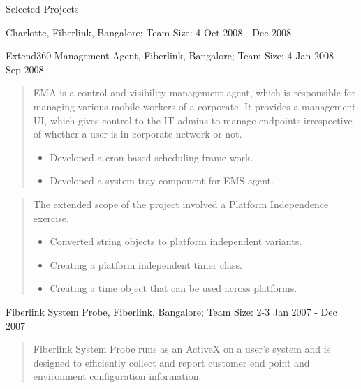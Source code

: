 \documentclass{resume}
\newcommand{\teamsize}{\sc\footnotesize Team Size: }
\begin{document}
\begin{category}{Selected Projects}{}

    \item {\topic Charlotte,} Fiberlink, Bangalore;
        {\teamsize 4}
        {\period Oct 2008 - Dec 2008}
        \begin{quote}
        \end{quote}

    \item {\topic Extend360 Management Agent,} Fiberlink, Bangalore;
        {\teamsize 4}
        {\period Jan 2008 - Sep 2008}
        \begin{quote}
            EMA is a control and visibility management agent, which is
            responsible for managing various mobile workers of a corporate. It
            provides a management UI, which gives control to the IT admins to
            manage endpoints irrespective of  whether a user is in corporate
            network or not.

            \begin{itemize}
                \item Developed a cron based scheduling frame work.
                \item Developed a system tray component for EMS agent.
            \end{itemize}
        \end{quote}
        \begin{quote}
            The extended scope of the project involved a Platform Independence
            exercise.

            \begin{itemize}
                \item Converted string objects to platform independent
                    variants.
                \item Creating a platform independent timer class.
                \item Creating a time object that can be used across platforms.
            \end{itemize}
        \end{quote}

    \item {\topic Fiberlink System Probe,} Fiberlink, Bangalore;
        {\teamsize 2-3}
        {\period Jan 2007 - Dec 2007}
        \begin{quote}
            Fiberlink System Probe runs as an ActiveX on a user’s system and is
            designed to efficiently collect and report customer end point and
            environment configuration information.


\end{quote}
\end{category}
\end{document}
